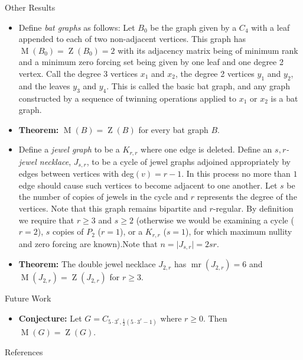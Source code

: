 \documentclass[final]{beamer}
\newcommand{\mr}{\operatorname{mr}}
\newcommand{\M}{\operatorname{M}}
\newcommand{\Z}{\operatorname{Z}}
\newcommand{\bit}{\begin{itemize}}
\newcommand{\eit}{\end{itemize}}
\begin{document}
\begin{frame}{}
\begin{columns}[t]
\begin{column}{0.38 \linewidth}
\begin{block}{Other Results}
\bit
\item Define {\color{blue}\emph{bat graphs}} as follows: Let $B_0$ be the graph given by a $C_4$ with a leaf appended to each of two non-adjacent vertices. This graph has $\M(B_0) = \Z(B_0) = 2$ with its adjacency matrix being of minimum rank and a minimum zero forcing set being given by one leaf and one degree 2 vertex. Call the degree 3 vertices $x_1$ and $x_2$, the degree 2 vertices $y_1$ and $y_2$, and the leaves $y_3$ and $y_4$. This is called the basic bat graph, and any graph constructed by a sequence of twinning operations applied to $x_1$ or $x_2$ is a bat graph.
\item {\bf Theorem:}  $\M(B) = \Z(B)$ for every bat graph $B$.
\item Define a {\color{blue}\emph{jewel graph}} to be a $K_{r,r}$ where one edge is deleted. Define an \emph{$s,r$-jewel necklace}, $J_{s,r}$, to be a cycle of jewel graphs adjoined appropriately by edges between vertices with deg$(v) = r-1$. In this process no more than $1$ edge should cause such vertices to become adjacent to one another. Let $s$ be the number of copies of jewels in the cycle and $r$ represents the degree of the vertices. Note that this graph remains bipartite and $r$-regular. By definition we require that $r \geq 3$ and $s \geq 2$ (otherwise we would be examining a cycle ($r=2$), $s$ copies of $P_2$ ($r=1$), or a $K_{r,r}$ ($s=1$), for which maximum nullity and zero forcing are known).Note that $n = \mid J_{s,r}\mid = 2sr$.
\item {\bf Theorem:} The double jewel necklace $J_{2,r}$ has $\mr(J_{2,r})=6$ and $\M(J_{2,r}) = \Z(J_{2,r})$ for $r \geq 3$.
\eit
\end{block}

\begin{block}{Future Work}
\bit
\item {\bf Conjecture:} Let $G =  C_{5\cdot 3^r,\frac{1}{2}(5\cdot3^r-1)}$
	where $r \geq 0$. Then $\M(G) = \Z(G)$. 
\eit
\end{block}

        
        

\begin{block}{References}
\begin{thebibliography}{20}
      

\end{thebibliography}
\end{block}
\end{column}
\end{columns}
\end{frame}
\end{document}
